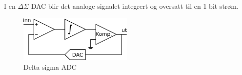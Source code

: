 I en $\Delta \Sigma$ DAC blir det analoge signalet integrert og oversatt
til en 1-bit strøm.

\begin{figure}[H]
  \centering
  \includegraphics[width = 0.5\textwidth]{./img/deltasigma}
  \caption{Delta-sigma ADC}
\end{figure}
